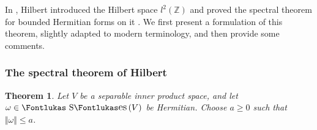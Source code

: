 \documentclass[12pt,b5paper,notitlepage]{article}
\theoremstyle{definition}
\theoremstyle{plain}
\newtheorem{thm}[df]{Theorem}
\DeclareMathOperator{\Ses}{\text{\Fontlukas S}\text{\kern -0pt {\Fontlukas\large es}}\,}
\newcommand{\Zbb}{\mathbb Z}
\numberwithin{equation}{section}
\begin{document}
In \cite{Hil06}, Hilbert introduced the Hilbert space $l^2(\Zbb)$ and proved the spectral theorem for bounded Hermitian forms on it \cite[Satz 31]{Hil06}. We first present a formulation of this theorem, slightly adapted to modern terminology, and then provide some comments.


\subsubsection{The spectral theorem of Hilbert}

\begin{thm}
Let $V$ be a separable inner product space, and let $\omega\in\Ses(V)$ be Hermitian. Choose $a\geq0$ such that $\Vert\omega\Vert\leq a$.
\end{thm}















\printindex	
\end{document}
